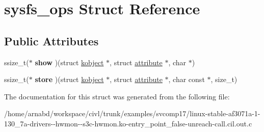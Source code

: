 \hypertarget{structsysfs__ops}{}\section{sysfs\+\_\+ops Struct Reference}
\label{structsysfs__ops}
\subsection*{Public Attributes}
\begin{DoxyCompactItemize}
\item 
\hypertarget{structsysfs__ops_a046e51dda32899278b56056e5b2a1a64}{}ssize\+\_\+t($\ast$ {\bfseries show} )(struct \hyperlink{structkobject}{kobject} $\ast$, struct \hyperlink{structattribute}{attribute} $\ast$, char $\ast$)\label{structsysfs__ops_a046e51dda32899278b56056e5b2a1a64}

\item 
\hypertarget{structsysfs__ops_af06ad1fb1b9bad697ca5a8bd48d9f8e1}{}ssize\+\_\+t($\ast$ {\bfseries store} )(struct \hyperlink{structkobject}{kobject} $\ast$, struct \hyperlink{structattribute}{attribute} $\ast$, char const $\ast$, size\+\_\+t)\label{structsysfs__ops_af06ad1fb1b9bad697ca5a8bd48d9f8e1}

\end{DoxyCompactItemize}


The documentation for this struct was generated from the following file\+:\begin{DoxyCompactItemize}
\item 
/home/arnabd/workspace/civl/trunk/examples/svcomp17/linux-\/stable-\/af3071a-\/1-\/130\+\_\+7a-\/drivers-\/-\/hwmon-\/-\/s3c-\/hwmon.\+ko-\/entry\+\_\+point\+\_\+false-\/unreach-\/call.\+cil.\+out.\+c\end{DoxyCompactItemize}
